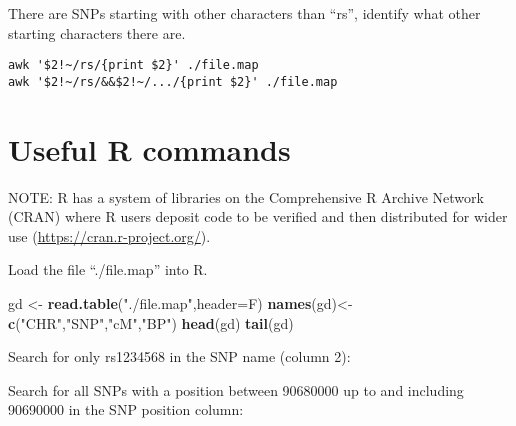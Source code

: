 \documentclass[]{book}
\newenvironment{Shaded}{\begin{snugshade}}{\end{snugshade}}
\newcommand{\KeywordTok}[1]{\textcolor[rgb]{0.13,0.29,0.53}{\textbf{#1}}}
\newcommand{\DataTypeTok}[1]{\textcolor[rgb]{0.13,0.29,0.53}{#1}}
\newcommand{\DecValTok}[1]{\textcolor[rgb]{0.00,0.00,0.81}{#1}}
\newcommand{\StringTok}[1]{\textcolor[rgb]{0.31,0.60,0.02}{#1}}
\newcommand{\OperatorTok}[1]{\textcolor[rgb]{0.81,0.36,0.00}{\textbf{#1}}}
\newcommand{\NormalTok}[1]{#1}
\begin{document}
There are SNPs starting with other characters than ``rs'', identify what
other starting characters there are.

\begin{verbatim}
awk '$2!~/rs/{print $2}' ./file.map
awk '$2!~/rs/&&$2!~/.../{print $2}' ./file.map
\end{verbatim}

\section{Useful R commands}\label{useful-r-commands}

NOTE: R has a system of libraries on the Comprehensive R Archive Network
(CRAN) where R users deposit code to be verified and then distributed
for wider use (\url{https://cran.r-project.org/}).

Load the file ``./file.map'' into R.

\begin{Shaded}
\begin{Highlighting}[]
\NormalTok{gd <-}\StringTok{ }\KeywordTok{read.table}\NormalTok{(}\StringTok{"./file.map"}\NormalTok{,}\DataTypeTok{header=}\NormalTok{F)}
\KeywordTok{names}\NormalTok{(gd)<-}\KeywordTok{c}\NormalTok{(}\StringTok{"CHR"}\NormalTok{,}\StringTok{"SNP"}\NormalTok{,}\StringTok{"cM"}\NormalTok{,}\StringTok{"BP"}\NormalTok{)}
\KeywordTok{head}\NormalTok{(gd)}
\KeywordTok{tail}\NormalTok{(gd)}
\end{Highlighting}
\end{Shaded}

Search for only rs1234568 in the SNP name (column 2):

\begin{Shaded}
\end{Shaded}

Search for all SNPs with a position between 90680000 up to and including
90690000 in the SNP position column:

\begin{Shaded}
\end{Shaded}
\end{document}
